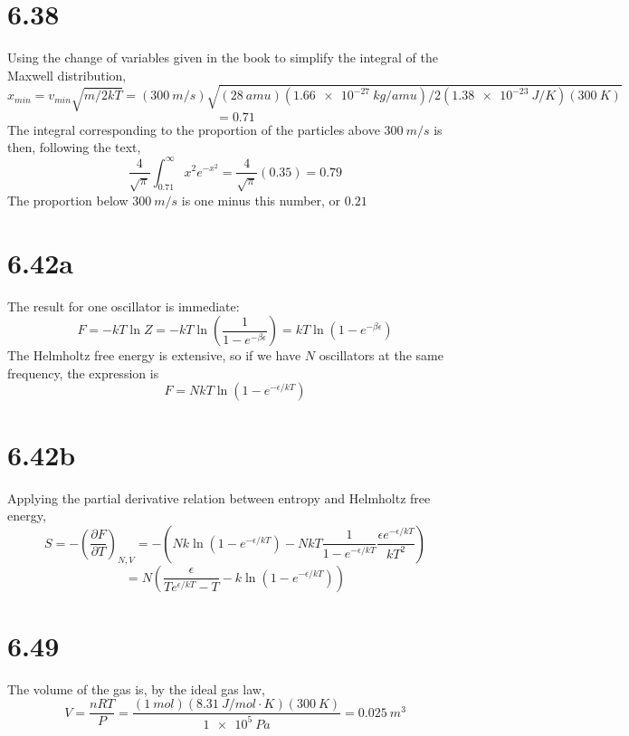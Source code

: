 \documentclass{article}
\begin{document}
\section*{6.38}
Using the change of variables given in the book to simplify the integral of the Maxwell distribution,
\[x_{min}=v_{min}\sqrt{m/2kT}=(\SI{300}{m/s})\sqrt{(\SI{28}{amu})(\SI{1.66e-27}{kg/amu})/2(\SI{1.38e-23}{J/K})(\SI{300}{K})}\]
\[=0.71\]
The integral corresponding to the proportion of the particles above $\SI{300}{m/s}$ is then, following the text,
\[\frac{4}{\sqrt{\pi}}\int_{0.71}^{\infty}x^{2}e^{-x^{2}}=\frac{4}{\sqrt{\pi}}(0.35)=0.79\]
The proportion below $\SI{300}{m/s}$ is one minus this number, or $0.21$

\section*{6.42a}
The result for one oscillator is immediate:
\[
  F=-kT\ln Z=-kT\ln\left( \frac{1}{1-e^{-\beta\epsilon}} \right)
  =kT\ln\left( 1-e^{-\beta\epsilon} \right)
\]
The Helmholtz free energy is extensive, so if we have $N$ oscillators at the same frequency, the expression is
\[
  F=NkT\ln\left( 1-e^{-\epsilon/kT} \right)
\]

\section*{6.42b}
Applying the partial derivative relation between entropy and Helmholtz free energy,
\[
  S=-\left( \frac{\partial F}{\partial T} \right)_{N,V}
  =-\left( Nk\ln\left(1-e^{-\epsilon/kT}  \right)-NkT\frac{1}{1-e^{-\epsilon/kT}}\frac{\epsilon e^{-\epsilon/kT}}{kT^{2}} \right)
\]
\[
  =N\left( \frac{\epsilon}{Te^{\epsilon/kT}-T}-k\ln\left( 1-e^{-\epsilon/kT} \right) \right)
\]

\section*{6.49}
The volume of the gas is, by the ideal gas law,
\[V=\frac{nRT}{P}=\frac{(\SI{1}{mol})(\SI{8.31}{J/mol\cdot K})(\SI{300}{K})}{\SI{1e5}{Pa}}=\SI{0.025}{m^{3}}\]
\end{document}
